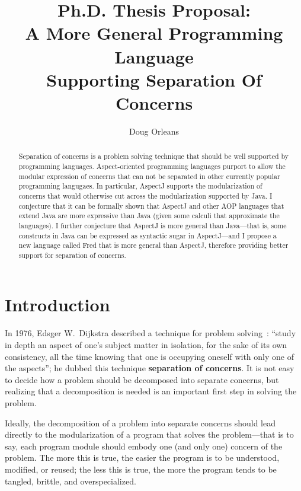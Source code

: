 \documentclass{article}
\title{Ph.D. Thesis Proposal: \\
A More General Programming Language \\
Supporting Separation Of Concerns}
\author{Doug Orleans}
\newcommand{\defn}[1]{\textbf{#1}}
\begin{document}

\maketitle



\begin{abstract}
\noindent Separation of concerns is a problem solving technique that
should be well supported by programming languages.  Aspect-oriented
programming languages purport to allow the modular expression of
concerns that can not be separated in other currently popular
programming langugaes.  In particular, AspectJ supports the
modularization of concerns that would otherwise cut across the
modularization supported by Java.  I conjecture that it can be
formally shown that AspectJ and other AOP languages that extend Java
are more expressive than Java (given some calculi that approximate the
languages).  I further conjecture that AspectJ is more general than
Java---that is, some constructs in Java can be expressed as syntactic
sugar in AspectJ---and I propose a new language called Fred that is
more general than AspectJ, therefore providing better support for
separation of concerns.
\end{abstract}

\section{Introduction}

In 1976, Edsger W.~Dijkstra described a technique for problem
solving~\cite[page 211]{dijkstra-SOC}: ``study in depth an aspect of
one's subject matter in isolation, for the sake of its own
consistency, all the time knowing that one is occupying oneself with
only one of the aspects''; he dubbed this technique \defn{separation
of concerns}.  It is not easy to decide how a problem should be
decomposed into separate concerns, but realizing that a decomposition
is needed is an important first step in solving the problem.

Ideally, the decomposition of a problem into separate concerns should
lead directly to the modularization of a program that solves the
problem---that is to say, each program module should embody one (and
only one) concern of the problem.  The more this is true, the easier
the program is to be understood, modified, or reused; the less this is 
true, the more the program tends to be tangled, brittle, and
overspecialized.
\end{document}
